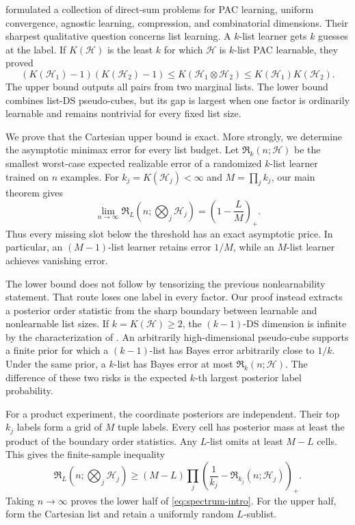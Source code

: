 \documentclass{article}
\theoremstyle{definition}
\theoremstyle{remark}
\newcommand{\cH}{\mathcal H}
\newcommand{\Risk}{\mathfrak R}
\newcommand{\1}{\mathbf 1}
\begin{document}
\citet{hanneke2024direct} formulated a collection of direct-sum problems for PAC learning, uniform convergence, agnostic learning, compression, and combinatorial dimensions. Their sharpest qualitative question concerns list learning. A \(k\)-list learner gets \(k\) guesses at the label. If \(K(\cH)\) is the least \(k\) for which \(\cH\) is \(k\)-list PAC learnable, they proved \[ (K(\cH_1)-1)(K(\cH_2)-1) \le K(\cH_1\otimes\cH_2) \le K(\cH_1)K(\cH_2). \] The upper bound outputs all pairs from two marginal lists. The lower bound combines list-DS pseudo-cubes, but its gap is largest when one factor is ordinarily learnable and remains nontrivial for every fixed list size.

We prove that the Cartesian upper bound is exact. More strongly, we determine the asymptotic minimax error for every list budget. Let \(\Risk_k(n;\cH)\) be the smallest worst-case expected realizable error of a randomized \(k\)-list learner trained on \(n\) examples. For \(k_j=K(\cH_j)<\infty\) and \(M=\prod_jk_j\), our main theorem gives
\begin{equation}
\label{eq:spectrum-intro}
\lim_{n\to\infty}\Risk_L\!\left(n;\bigotimes_j\cH_j\right)
=\left(1-\frac{L}{M}\right)_+.
\end{equation}
Thus every missing slot below the threshold has an exact asymptotic price. In particular, an \((M-1)\)-list learner retains error \(1/M\), while an \(M\)-list learner achieves vanishing error.

The lower bound does not follow by tensorizing the previous nonlearnability statement. That route loses one label in every factor. Our proof instead extracts a posterior order statistic from the sharp boundary between learnable and nonlearnable list sizes. If \(k=K(\cH)\ge2\), the \((k-1)\)-DS dimension is infinite by the characterization of \citet{charikar2023characterization}. An arbitrarily high-dimensional pseudo-cube supports a finite prior for which a \((k-1)\)-list has Bayes error arbitrarily close to \(1/k\). Under the same prior, a \(k\)-list has Bayes error at most \(\Risk_k(n;\cH)\). The difference of these two risks is the expected \(k\)-th largest posterior label probability.

For a product experiment, the coordinate posteriors are independent. Their top \(k_j\) labels form a grid of \(M\) tuple labels. Every cell has posterior mass at least the product of the boundary order statistics. Any \(L\)-list omits at least \(M-L\) cells. This gives the finite-sample inequality
\begin{equation}
\label{eq:lower-intro}
\Risk_L\!\left(n;\bigotimes_j\cH_j\right)
\ge (M-L)\prod_j\left(\frac1{k_j}-\Risk_{k_j}(n;\cH_j)\right)_+.
\end{equation}
Taking \(n\to\infty\) proves the lower half of \eqref{eq:spectrum-intro}. For the upper half, form the Cartesian list and retain a uniformly random \(L\)-sublist.
\end{document}
